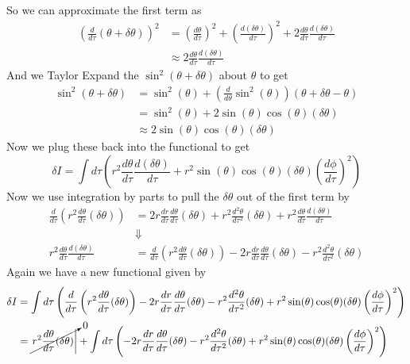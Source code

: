 \documentclass[11pt]{article}
\numberwithin{equation}{section}
\begin{document}
\begin{enumerate}[(a)]
So we can approximate the first term as
\begin{align*}
\left(\frac{d}{d\tau}(\theta+\delta\theta)\right)^2 &= \left(\frac{d\theta}{d\tau}\right)^2 + \left(\frac{d(\delta\theta)}{d\tau}\right)^2 + 2\frac{d\theta}{d\tau}\frac{d(\delta\theta)}{d\tau}\\
&\approx 2\frac{d\theta}{d\tau}\frac{d(\delta\theta)}{d\tau}
\end{align*}
And we Taylor Expand the $\sin^2(\theta+\delta\theta)$ about $\theta$ to get
\begin{align*}
\sin^2(\theta+\delta\theta) &= \sin^2(\theta) + \left(\frac{d}{d\theta}\sin^2(\theta)\right)(\theta+\delta\theta-\theta)\\
&= \sin^2(\theta) + 2\sin(\theta)\cos(\theta)(\delta\theta)\\
&\approx 2\sin(\theta)\cos(\theta)(\delta\theta)
\end{align*}
Now we plug these back into the functional to get
$$\delta I = \int d\tau\left(r^2\frac{d\theta}{d\tau}\frac{d(\delta\theta)}{d\tau}+r^2\sin(\theta)\cos(\theta)(\delta\theta)\left(\frac{d\phi}{d\tau}\right)^2\right)$$
Now we use integration by parts to pull the $\delta\theta$ out of the first term by
\begin{align*}
\frac{d}{d\tau}\left(r^2\frac{d\theta}{d\tau}(\delta\theta)\right) &= 2r\frac{dr}{d\tau}\frac{d\theta}{d\tau}(\delta\theta) + r^2\frac{d^2\theta}{d\tau^2}(\delta\theta) + r^2\frac{d\theta}{d\tau}\frac{d(\delta\theta)}{d\tau}\\
&\Downarrow\\
r^2\frac{d\theta}{d\tau}\frac{d(\delta\theta)}{d\tau} &= \frac{d}{d\tau}\left(r^2\frac{d\theta}{d\tau}(\delta\theta)\right) - 2r\frac{dr}{d\tau}\frac{d\theta}{d\tau}(\delta\theta) - r^2\frac{d^2\theta}{d\tau^2}(\delta\theta)  
\end{align*}
Again we have a new functional given by
\begin{align*}
\delta I &= \int d\tau\left(\frac{d}{d\tau}\left(r^2\frac{d\theta}{d\tau}(\delta\theta)\right) - 2r\frac{dr}{d\tau}\frac{d\theta}{d\tau}(\delta\theta) - r^2\frac{d^2\theta}{d\tau^2}(\delta\theta)  +r^2\sin(\theta)\cos(\theta)(\delta\theta)\left(\frac{d\phi}{d\tau}\right)^2\right)\\
&= \cancelto{0}{\left.r^2\frac{d\theta}{d\tau}(\delta\theta)\right|} + \int d\tau\left( - 2r\frac{dr}{d\tau}\frac{d\theta}{d\tau}(\delta\theta) - r^2\frac{d^2\theta}{d\tau^2}(\delta\theta)  +r^2\sin(\theta)\cos(\theta)(\delta\theta)\left(\frac{d\phi}{d\tau}\right)^2\right)\\

\end{align*}
\end{enumerate}
\end{document}
